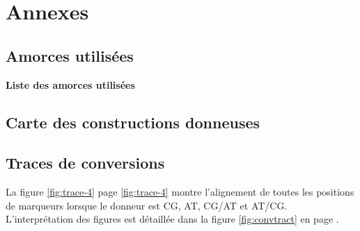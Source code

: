 \newpage
{}
\setcounter{page}{1}

\begin{multicols}{2}
\rmfamily
\footnotesize

\end{multicols}
\afterpage{\blankpage}


\setcounter{section}{0}
\section{Annexes}
\setcounter{subsection}{1}


\subsection{Amorces utilisées}
\label{subsec:amorces}


\caption[Liste des amorces utilisées]{\label{fig:amorces}\textbf{Liste des
    amorces utilisées}}

\subsection{Carte des constructions donneuses}
\label{subsec:cartes-plasmides}



\subsection{Traces de conversions}
\label{sec:trac-de-conv}

La figure \ref{fig:trace-4} page \ref{fig:trace-4} montre l'alignement de toutes
les positions de marqueurs lorsque le donneur est CG, AT, CG/AT et AT/CG.
L'interprétation des figures est détaillée dans la figure \ref{fig:convtract} en
page \pageref{fig:convtract}.

% 


